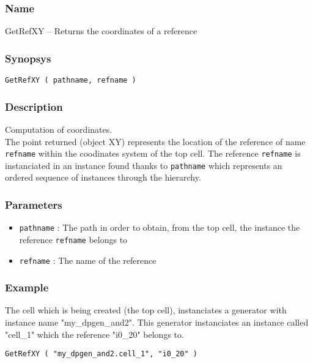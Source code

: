 \subsubsection{Name}

GetRefXY -- Returns the coordinates of a reference

\subsubsection{Synopsys}

\begin{verbatim}
GetRefXY ( pathname, refname )
\end{verbatim}

\subsubsection{Description}

Computation of coordinates.\\
\indent The point returned (object XY) represents the location of the reference of name \verb-refname-  within the coodinates system of the top cell. The reference \verb-refname- is instanciated in an instance found thanks to \verb-pathname- which represents an ordered sequence of instances through the hierarchy.
    
\subsubsection{Parameters}

\begin{itemize}
    \item \verb-pathname- : The path in order to obtain, from the top cell, the instance the reference \verb-refname- belongs to
    \item \verb-refname- : The name of the reference
\end{itemize}
    
\subsubsection{Example}

\indent The cell which is being created (the top cell), instanciates a generator with instance name "my\_dpgen\_and2". This generator instanciates an instance called "cell\_1" which the reference "i0\_20" belongs to.
\begin{verbatim}
GetRefXY ( "my_dpgen_and2.cell_1", "i0_20" )
\end{verbatim}

